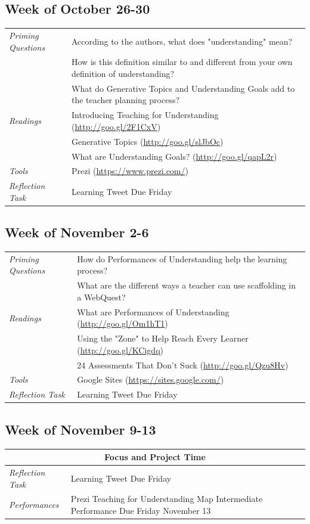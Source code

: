 \documentclass{tufte-handout}
\newcommand{\tabpq}{\faQuestionCircle\medspace\textit{Priming Questions}}
\newcommand{\tabread}{\faBook\medspace\textit{Readings}}
\newcommand{\tabperformance}{\faTasks\medspace\textit{Performances}}
\newcommand{\tabtools}{\faWrench\medspace\textit{Tools}}
\newcommand{\tabtweet}{\faLightbulbO\medspace\textit{Reflection Task} & Learning Tweet Due Friday \\}
\newenvironment{tabsched}
	{\small
	\begin{tabular}{p{1.5in}p{4.5in}}
	\toprule}
	{\bottomrule
	\end{tabular}
	\normalsize}
\newcommand{\weekeleven}{October 26-30}
\newcommand{\weektwelve}{November 2-6}
\newcommand{\weekthirteen}{November 9-13}
\begin{document}
\subsection{Week of \weekeleven}

\begin{tabsched}
	\tabpq & According to the authors, what does "understanding" mean? \\
	& How is this definition similar to and different from your own definition of understanding? \\
	& What do Generative Topics and Understanding Goals add to the teacher planning process? \\
	\midrule
	\tabread & Introducing Teaching for Understanding (\url{http://goo.gl/2F1CxV}) \\
	& Generative Topics (\url{http://goo.gl/slJbOc}) \\
	& What are Understanding Goals? (\url{http://goo.gl/qapL2r}) \\
	\midrule
	\tabtools & Prezi (\url{https://www.prezi.com/}) \\
	\midrule
	\tabtweet
\end{tabsched}

\subsection{Week of \weektwelve}

\begin{tabsched}
	\tabpq & How do Performances of Understanding help the learning process? \\
	& What are the different ways a teacher can use scaffolding in a WebQuest? \\
	\midrule
	\tabread & What are Performances of Understanding (\url{http://goo.gl/Om1hT1}) \\
	& Using the "Zone" to Help Reach Every Learner (\url{http://goo.gl/KCigdq}) \\
	& 24 Assessments That Don't Suck (\url{http://goo.gl/Qzu8Hv}) \\
	\midrule
	\tabtools & Google Sites (\url{https://sites.google.com/}) \\
	\midrule
	\tabtweet
\end{tabsched}

\subsection{Week of \weekthirteen}

\begin{tabsched}
	\multicolumn{2}{c}{\faLaptop\medspace\textbf{Focus and Project Time}\medspace\faLaptop} \\
	\midrule
	\tabtweet
	\midrule
	\tabperformance & Prezi Teaching for Understanding Map Intermediate Performance Due Friday November 13 \\
\end{tabsched}
\end{document}
